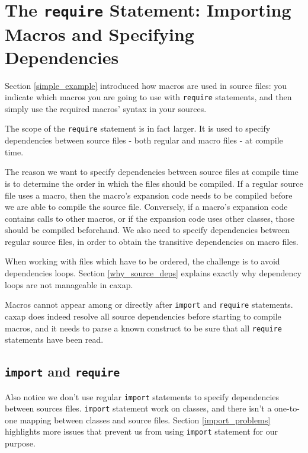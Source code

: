 \section{The \texttt{require} Statement: Importing Macros and Specifying
  Dependencies}
\label{require_manual}

Section \ref{simple_example} introduced how macros are used in source files: you
indicate which macros you are going to use with \texttt{require} statements, and
then simply use the required macros' syntax in your sources.

The scope of the \texttt{require} statement is in fact larger. It is used to
specify dependencies between source files - both regular and macro files - at
compile time.

The reason we want to specify dependencies between source files at compile time
is to determine the order in which the files should be compiled. If a regular
source file uses a macro, then the macro's expansion code needs to be compiled
before we are able to compile the source file. Conversely, if a macro's
expansion code contains calls to other macros, or if the expansion code uses
other classes, those should be compiled beforehand. We also need to specify
dependencies between regular source files, in order to obtain the transitive
dependencies on macro files.

When working with files which have to be ordered, the challenge is to avoid
dependencies loops. Section \ref{why_source_deps} explains exactly why
dependency loops are not manageable in caxap.

Macros cannot appear among or directly after \texttt{import} and
\texttt{require} statements. caxap does indeed resolve all source dependencies
before starting to compile macros, and it needs to parse a known construct to be
sure that all \texttt{require} statements have been read.

\subsection{\texttt{import} and \texttt{require}}

Also notice we don't use regular \texttt{import} statements to specify
dependencies between sources files. \texttt{import} statement work on classes,
and there isn't a one-to-one mapping between classes and source files. Section
\ref{import_problems} highlights more issues that prevent us from using
\texttt{import} statement for our purpose.

